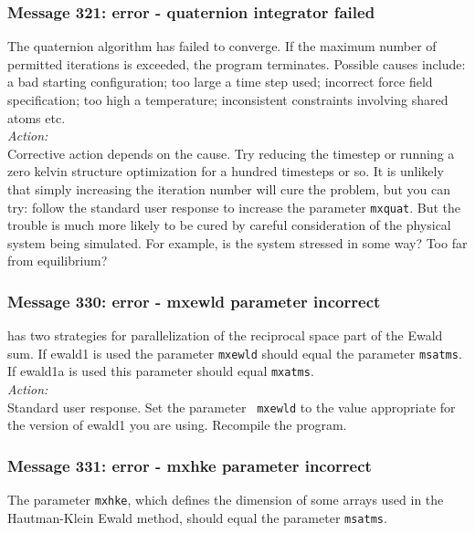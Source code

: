 \subsubsection*{Message 321: error - quaternion integrator failed}

The quaternion algorithm has failed to converge. If the
maximum number of permitted iterations is exceeded, the program
terminates. Possible causes include: a bad starting configuration; too
large a time step used; incorrect force field specification; too high
a temperature; inconsistent constraints involving shared atoms etc. \\ 

\noindent
{\em Action:}\\ Corrective action depends on the cause. Try reducing
the timestep or running a zero kelvin structure optimization for a
hundred timesteps or so.  It is unlikely that simply increasing the
iteration number will cure the problem, but you can try: follow the
standard user response to increase the parameter {\tt mxquat}. But the
trouble is much more likely to be cured by careful consideration of
the physical system being simulated. For example, is the system
stressed in some way? Too far from equilibrium?

\subsubsection*{Message 330: error - mxewld parameter incorrect}

\D{} has two strategies for parallelization of the reciprocal space part
of the Ewald sum. If {\sc ewald1} is used the
parameter {\tt mxewld} should equal the parameter {\tt msatms}. If
{\sc ewald1a} is used this parameter should equal {\tt mxatms}.\\

\noindent
{\em Action:} \\ Standard user response. Set the parameter {\tt
mxewld} to the value appropriate for the version of {\sc ewald1} you
are using. Recompile the program.

\subsubsection*{Message 331: error - mxhke parameter incorrect}

The parameter {\tt mxhke}, which defines the dimension of some arrays
used in the Hautman-Klein Ewald method, should equal the parameter
{\tt msatms}.\\

